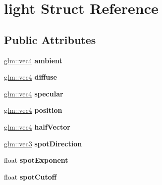 \hypertarget{structlight}{}\section{light Struct Reference}
\label{structlight}
\subsection*{Public Attributes}
\begin{DoxyCompactItemize}
\item 
\hyperlink{group__core__types_ga5881b1b022d7fd1b7218f5916532dd02}{glm\+::vec4} {\bfseries ambient}\hypertarget{structlight_a55272e98f6354987f671e462020a114f}{}\label{structlight_a55272e98f6354987f671e462020a114f}

\item 
\hyperlink{group__core__types_ga5881b1b022d7fd1b7218f5916532dd02}{glm\+::vec4} {\bfseries diffuse}\hypertarget{structlight_a3c5ae9ee6f2d72bd13b0f11f7dbc8802}{}\label{structlight_a3c5ae9ee6f2d72bd13b0f11f7dbc8802}

\item 
\hyperlink{group__core__types_ga5881b1b022d7fd1b7218f5916532dd02}{glm\+::vec4} {\bfseries specular}\hypertarget{structlight_a03121f7e82d16d3b67fa0cd3efc30eb6}{}\label{structlight_a03121f7e82d16d3b67fa0cd3efc30eb6}

\item 
\hyperlink{group__core__types_ga5881b1b022d7fd1b7218f5916532dd02}{glm\+::vec4} {\bfseries position}\hypertarget{structlight_a9cb7c5d031dcfd66ff10480aa021235a}{}\label{structlight_a9cb7c5d031dcfd66ff10480aa021235a}

\item 
\hyperlink{group__core__types_ga5881b1b022d7fd1b7218f5916532dd02}{glm\+::vec4} {\bfseries half\+Vector}\hypertarget{structlight_af8848393784e35f096bea1a663ba1a9c}{}\label{structlight_af8848393784e35f096bea1a663ba1a9c}

\item 
\hyperlink{group__core__types_ga1c47e8b3386109bc992b6c48e91b0be7}{glm\+::vec3} {\bfseries spot\+Direction}\hypertarget{structlight_a24ba4cefe6d7757dd48be420ac70713e}{}\label{structlight_a24ba4cefe6d7757dd48be420ac70713e}

\item 
float {\bfseries spot\+Exponent}\hypertarget{structlight_a537f6f54361118f6211c99c26716a848}{}\label{structlight_a537f6f54361118f6211c99c26716a848}

\item 
float {\bfseries spot\+Cutoff}\hypertarget{structlight_ae9caaef52485008773b4169e8ca71def}{}\label{structlight_ae9caaef52485008773b4169e8ca71def}


\end{DoxyCompactItemize}

